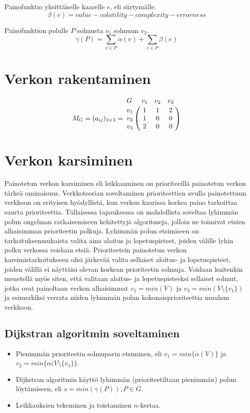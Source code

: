   Painofunktio yksittäiselle kaarelle \(e\), eli siirtymälle.
  \[\beta(e) = value - volatility - complexity - errorness\]

  Painofunktion polulle \(P\) solmusta \(v_1\) solmuun \(v_2\).
  \[\gamma(P) = \sum_{v \in P} \alpha(v) + \sum_{e \in P} \beta(e)\]

  \section{Verkon rakentaminen} \label{ch:10_verkon_rakentaminen}

  \[
    M_G = (a_{ij})_{3\times3} =
    \bordermatrix{
      G & v_1 & v_2 & v_3 \cr
      v_1 & 1 & 1 & 2 \cr
      v_2 & 1 & 0 & 0 \cr
      v_3 & 2 & 0 & 0 \cr
    }
  \]

\section{Verkon karsiminen} \label{ch:10_verkon_karsiminen}

  Painotetun verkon karsiminen eli leikkaaminen on prioriteeillä painotetun verkon tärkeä ominaisuus.
  Verkkoteorian soveltaminen prioriteettien avulla painotettuun verkkoon on erityisen hyödyllistä, kun verkon kaarissa korkea paino tarkoittaa suurta prioriteettia.
  Tällaisessa tapauksessa on mahdollista soveltaa lyhimmän polun ongelman ratkaisemiseen kehitettyjä algoritmeja, jolloin ne toimivat etsien alhaisimman prioriteetin polkuja.
  Lyhimmän polun etsimiseen on tarkoituksenmukaista valita aina aloitus ja lopetuspisteet, joiden välille lyhin polku verkossa voidaan etsiä.
  Prioriteetein painotetun verkon karsimistarkoitukseen olisi järkevää valita sellaiset aloitus- ja lopetuspisteet, joiden välillä ei näyttäisi olevan korkean prioriteetin solmuja.
  Voidaan kuitenkin menetellä myös siten, että valitaan aloitus- ja lopetuspisteeksi sellaiset solmut, jotka ovat painoltaan verkon alhaisimmat \(v_1 = min(V)\) ja \(v_2 = min(V \setminus \{v_1\})\) ja esimerkiksi verrata niiden lyhimmän polun kokonaisprioriteettia muuhun verkkoon.

  \subsection{Dijkstran algoritmin soveltaminen} \label{ch:10_djikstran_algoritmin_soveltaminen}

    \begin{itemize}
      \item Pienimmän prioriteetin solmuparin etsiminen, eli \(v_1 = min\{ \alpha(V) \}\) ja \(v_2 = min\{\alpha( V \setminus \{v_1\} \}\).
      \item Dijkstran algoritmin käyttö lyhimmän (prioriteetiltaan pienimmän) polun löytämiseen, eli \(s = min( \gamma(P) ), P \in G\).
      \item Leikkauksien tekeminen ja toistaminen \(n\)-kertaa.
    \end{itemize}

